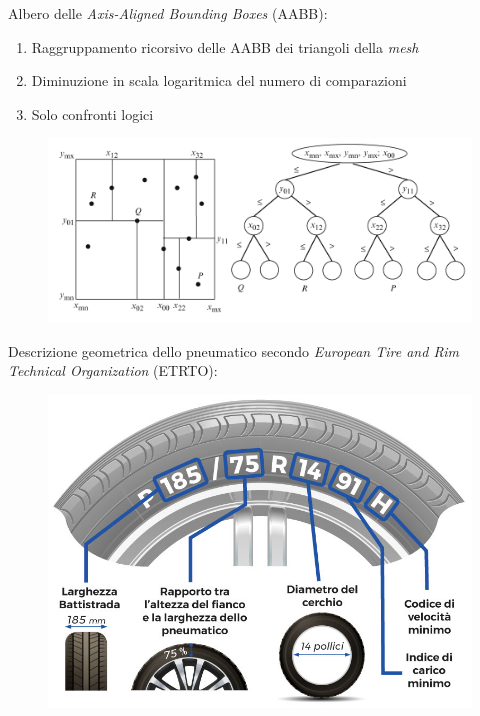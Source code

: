 \documentclass[xcolor=dvipsnames]{beamer} %
\begin{document}
\begin{frame}
	\Large{Albero delle \textit{Axis-Aligned Bounding Boxes} (AABB)}:
	\normalsize
	\begin{enumerate}
		\item Raggruppamento ricorsivo delle AABB dei triangoli della \textit{mesh}
		\item Diminuzione in scala logaritmica del numero di comparazioni
		\item Solo confronti logici
	\end{enumerate}
	\begin{figure}
		\centering
		\includegraphics[width=0.85\linewidth]{../Figures/AABB}
	\end{figure}
\end{frame}

\begin{frame}
	\Large {Descrizione geometrica dello pneumatico secondo \textit{European Tire and Rim Technical Organization} (ETRTO)}:
	\begin{figure}
		\centering
		\includegraphics[width=0.7\linewidth]{../Figures/tire_measures}
	\end{figure}
\end{frame}
\end{document}
